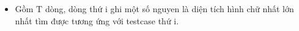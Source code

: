 \begin{itemize}
	\item Gồm T dòng, dòng thứ i ghi một số nguyen là diện tích hình chữ nhất lớn nhất tìm được tương ứng với testcase thứ i.
\end{itemize}